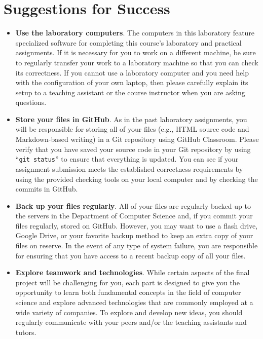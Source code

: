 \documentclass[11pt]{article}
\newcommand{\command}[1]{``\lstinline{#1}''}
\begin{document}
\section*{Suggestions for Success}

\begin{itemize}
  \setlength{\itemsep}{0pt}

\item {\bf Use the laboratory computers}. The computers in this laboratory
  feature specialized software for completing this course's laboratory and
  practical assignments. If it is necessary for you to work on a different
  machine, be sure to regularly transfer your work to a laboratory machine so
  that you can check its correctness. If you cannot use a laboratory computer
  and you need help with the configuration of your own laptop, then please
  carefully explain its setup to a teaching assistant or the course instructor
  when you are asking questions.

\item {\bf Store your files in GitHub}. As in the past laboratory assignments,
  you will be responsible for storing all of your files (e.g., HTML source code
  and Markdown-based writing) in a Git repository using GitHub Classroom. Please
  verify that you have saved your source code in your Git repository by using
  \command{git status} to ensure that everything is updated. You can see if your
  assignment submission meets the established correctness requirements by using
  the provided checking tools on your local computer and by checking the commits
  in GitHub.

\item {\bf Back up your files regularly}. All of your files are regularly
  backed-up to the servers in the Department of Computer Science and, if you
  commit your files regularly, stored on GitHub. However, you may want to use a
  flash drive, Google Drive, or your favorite backup method to keep an extra
  copy of your files on reserve. In the event of any type of system failure, you
  are responsible for ensuring that you have access to a recent backup copy of
  all your files.

\item {\bf Explore teamwork and technologies}. While certain aspects of the
  final project will be challenging for you, each part is designed to give you
  the opportunity to learn both fundamental concepts in the field of computer
  science and explore advanced technologies that are commonly employed at a wide
  variety of companies. To explore and develop new ideas, you should regularly
  communicate with your peers and/or the teaching assistants and tutors.


\end{itemize}
\end{document}
